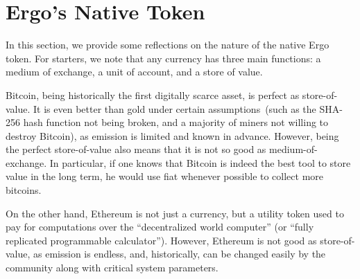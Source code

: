 \section{Ergo's Native Token}




 In this section, we provide some reflections on the nature of the native Ergo token. For starters, we note that
 any currency has three main functions: a medium of exchange, a unit of account, and a store of value.

 Bitcoin, being historically the first digitally scarce asset, is perfect as store-of-value. It is even better than gold under certain assumptions~(such as the SHA-256 hash function not being broken, and a majority of miners not willing to destroy Bitcoin), as emission is limited and known in advance. However, being the perfect store-of-value also means that it is not so good as medium-of-exchange. In particular, if one knows that Bitcoin is indeed the best tool to store value in the long term, he would use fiat whenever possible to collect more bitcoins.

 On the other hand, Ethereum is not just a currency, but a utility token used to pay for computations over the
``decentralized world computer'' (or ``fully replicated programmable calculator''). However, Ethereum is not good as
 store-of-value, as emission is endless, and, historically, can be changed easily by the community along with critical system parameters.

